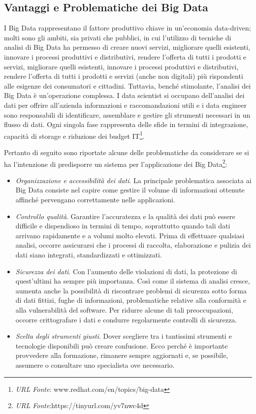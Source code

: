 \subsection{Vantaggi e Problematiche dei Big Data}

I Big Data rappresentano il fattore produttivo chiave in un'economia data-driven; molti sono gli ambiti, sia privati che pubblici, in cui l'utilizzo di tecniche di analisi di Big Data ha permesso di creare nuovi servizi, migliorare quelli esistenti, innovare i processi produttivi e distributivi, rendere l'offerta di tutti i prodotti e servizi, migliorare quelli esistenti, innovare i processi produttivi e distributivi, rendere l'offerta di tutti i prodotti e servizi (anche non digitali) più rispondenti alle esigenze dei consumatori e cittadini. Tuttavia, benché stimolante, l'analisi dei Big Data è un'operazione complessa. I data scientist si occupano dell'analisi dei dati per offrire all'azienda informazioni e raccomandazioni utili e i data engineer sono responsabili di identificare, assemblare e gestire gli strumenti necessari in un flusso di dati. Ogni singola fase rappresenta delle sfide in termini di integrazione, capacità di storage e riduzione dei budget IT\footnote{\textit{URL Fonte}: www.redhat.com/en/topics/big-data}.

Pertanto di seguito sono riportate alcune delle problematiche da considerare se si ha l'intenzione di predisporre un sistema per l'applicazione dei Big Data\footnote{\textit{URL Fonte}:https://tinyurl.com/yv7nwc4d}:

\begin{itemize}
    \item \textit{Organizzazione e accessibilità dei dati}. La principale problematica associata ai Big Data consiste nel capire come gestire il volume di informazioni ottenute affinché pervengano correttamente nelle applicazioni.
    \item \textit{Controllo qualità}. Garantire l'accuratezza e la qualità dei dati può essere difficile e dispendioso in termini di tempo, soprattutto quando tali dati arrivano rapidamente e a volumi molto elevati. Prima di effettuare qualsiasi analisi, occorre assicurarsi che i processi di raccolta, elaborazione e pulizia dei dati siano integrati, standardizzati e ottimizzati.
    \item \textit{Sicurezza dei dati}. Con l'aumento delle violazioni di dati, la protezione di quest'ultimi ha sempre più importanza. Così come il sistema di analisi cresce, aumenta anche la possibilità di riscontrare problemi di sicurezza sotto forma di dati fittizi, fughe di informazioni, problematiche relative alla conformità e alla vulnerabilità del software. Per ridurre alcune di tali preoccupazioni, occorre crittografare i dati e condurre regolarmente controlli di sicurezza.
    \item \textit{Scelta degli strumenti giusti}. Dover scegliere tra i tantissimi strumenti e tecnologie disponibili può creare confusione. Ecco perché è importante provvedere alla formazione, rimanere sempre aggiornati e, se possibile, assumere o consultare uno specialista ove necessario.
\end{itemize}

